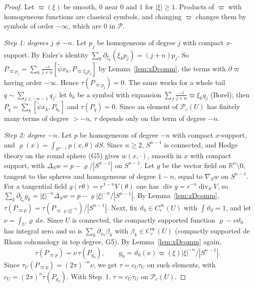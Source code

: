 \documentclass[11pt,oneside,reqno]{article}
\newcommand{\R}{\mathbb R}
\newcommand{\cP}{\mathcal P}
\newcommand{\CI}{C^\infty}
\newcommand{\pa}{\partial}
\theoremstyle{plain}
\theoremstyle{definition}
\theoremstyle{remark}
\begin{document}
\begin{proof}
Let \(\varpi(\xi)\) be smooth, \(0\) near \(0\) and \(1\) for \(|\xi|\ge1\). Products of \(\varpi\) with homogeneous
functions are classical symbols, and changing \(\varpi\) changes them by symbols of order
\(-\infty\), which are \(0\) in \(\cP\).

\emph{Step 1: degrees \(j\ne-n\).} Let \(p_j\) be homogeneous of degree \(j\) with compact
\(x\)-support. By Euler's identity \(\sum_k\pa_{\xi_k}(\xi_kp_j)=(j+n)p_j\). So
\(P_{\varpi p_j}=\sum_k\frac{-i}{j+n}[\tilde\psi x_k,P_{\varpi\xi_kp_j}]\) by Lemma~\ref{lem:xDcomm}, the
terms with \(\pa\varpi\) having order \(-\infty\). Hence \(\tau(P_{\varpi p_j})=0\). The same works for a
whole tail \(q\sim\sum_{j\le-n-1}q_j\): let \(b_k\) be a symbol with expansion
\(\sum_j\frac{-i}{j+n}\varpi\xi_kq_j\) (Borel); then \(P_q=\sum_k[\tilde\psi x_k,P_{b_k}]\) and \(\tau(P_q)=0\).
Since an element of \(\cP_c(U)\) has finitely many terms of degree \(>-n\), \(\tau\) depends
only on the term of degree \(-n\).

\emph{Step 2: degree \(-n\).} Let \(p\) be homogeneous of degree \(-n\) with compact
\(x\)-support, and \(\varrho(x)=\int_{S^{n-1}}p(x,\theta)\,dS\). Since \(n\ge2\), \(S^{n-1}\) is connected,
and Hodge theory on the round sphere (G5) gives \(w(x,\cdot)\), smooth in \(x\) with
compact support, with \(\Delta_Sw=p-\varrho/|S^{n-1}|\) on \(S^{n-1}\). Let \(g\) be the vector field on
\(\R^n\setminus0\), tangent to the spheres and homogeneous of degree \(1-n\), equal to
\(\nabla_Sw\) on \(S^{n-1}\). For a tangential field \(g(r\theta)=r^{1-n}V(\theta)\) one has
\(\operatorname{div}g=r^{-n}\operatorname{div}_SV\), so
\(\sum_k\pa_{\xi_k}g_k=|\xi|^{-n}\Delta_Sw=p-\varrho|\xi|^{-n}/|S^{n-1}|\). By Lemma~\ref{lem:xDcomm},
\(\tau(P_{\varpi p})=\tau(P_{\varpi\varrho|\xi|^{-n}})/|S^{n-1}|\). Next, fix \(\vartheta_0\in\CI_c(U)\) with
\(\int\vartheta_0=1\), and let \(\nu=\int_U\varrho\,dx\). Since \(U\) is connected, the compactly
supported function \(\varrho-\nu\vartheta_0\) has integral zero and so is
\(\sum_k\pa_{x_k}\beta_k\) with \(\beta_k\in\CI_c(U)\) (compactly supported de Rham cohomology in top
degree, G5). By Lemma~\ref{lem:xDcomm} again,
\[
 \tau(P_{\varpi p})=\nu\,\tau(P_{g_0}),\qquad g_0=\vartheta_0(x)\varpi(\xi)|\xi|^{-n}/|S^{n-1}| .
\]
Since \(\tau_U(P_{\varpi p})=(2\pi)^{-n}\nu\), we get \(\tau=c_U\tau_U\) on such elements, with
\(c_U=(2\pi)^n\tau(P_{g_0})\). With Step~1, \(\tau=c_U\tau_U\) on \(\cP_c(U)\).
\end{proof}
\end{document}
